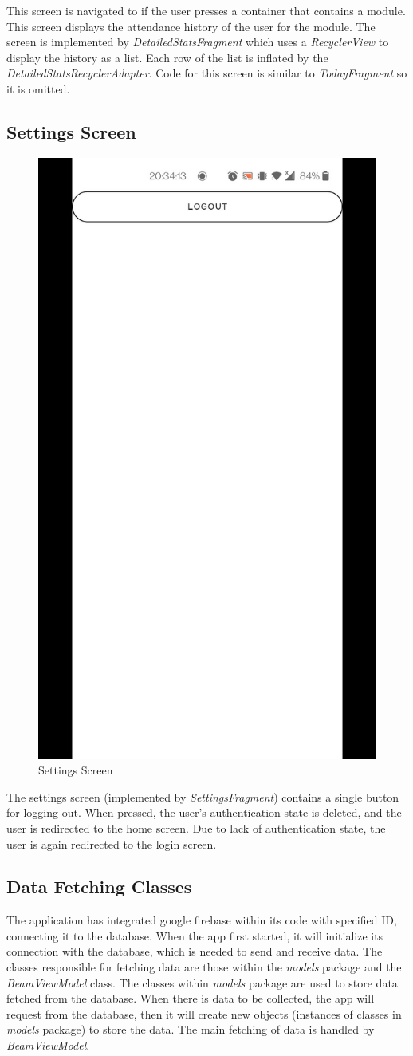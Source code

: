 \documentclass[../report.tex]{subfiles}
\begin{document}
This screen is navigated to if the user presses a container that contains a module. This screen displays the attendance history of the user for the module. The screen is implemented by \textit{DetailedStatsFragment} which uses a \textit{RecyclerView} to display the history as a list. Each row of the list is inflated by the \textit{DetailedStatsRecyclerAdapter}. Code for this screen is similar to \textit{TodayFragment} so it is omitted.

\subsection{Settings Screen}

\begin{figure}[H]
	\centering
	\includegraphics[width=.28\linewidth]{../images/07/02-app-settings.jpg}
	\caption{Settings Screen}
	\label{fig:app-settings-screen}
\end{figure}
\pagebreak
The settings screen (implemented by \textit{SettingsFragment}) contains a single button for logging out. When pressed, the user’s authentication state is deleted, and the user is redirected to the home screen. Due to lack of authentication state, the user is again redirected to the login screen.



\subsection{Data Fetching Classes}
The application has integrated google firebase within its code with specified ID, connecting it to the database. When the app first started, it will initialize its connection with the database, which is needed to send and receive data. The classes responsible for fetching data are those within the \textit{models} package and the \textit{BeamViewModel} class. The classes within \textit{models} package are used to store data fetched from the database. When there is data to be collected, the app will request from the database, then it will create new objects (instances of classes in \textit{models} package) to store the data. The main fetching of data is handled by \textit{BeamViewModel}.
\end{document}
